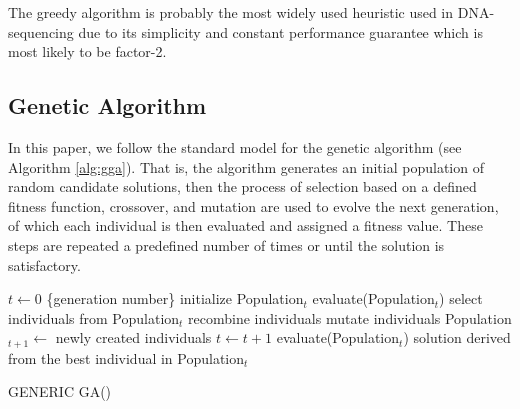 The greedy algorithm is probably the most widely used
heuristic used in DNA-sequencing due to its simplicity and 
constant performance guarantee which is most likely to be factor-2.

\subsection{Genetic Algorithm}

In this paper, we follow the standard model for the genetic algorithm (see Algorithm \ref{alg:gga}).
That is, the algorithm generates an initial population of 
random candidate solutions, then 
the process of selection based on a defined fitness function,
crossover, and mutation are used to evolve the next generation, of which
each individual is then evaluated and
assigned a fitness value. These steps are repeated a
predefined number of times or until the solution is
satisfactory. 


\begin{algorithm}[H]
	\begin{algorithmic}[1]
	\STATE $t \leftarrow 0$ \{generation number\} 
	\STATE initialize Population$_{t}$ 
	\STATE evaluate(Population$_{t}$)
		\STATE select individuals from Population$_{t}$ 
		\STATE recombine individuals
		\STATE mutate individuals	
		\STATE Population$_{t+1} \leftarrow $ newly created individuals
		\STATE $t \leftarrow t + 1$
		\STATE evaluate(Population$_{t}$) 			
	\ENDWHILE
	\RETURN solution derived from the best individual in Population$_{t}$
	\end{algorithmic}
	\caption{GENERIC GA()}
	\label{alg:gga}
\end{algorithm}
